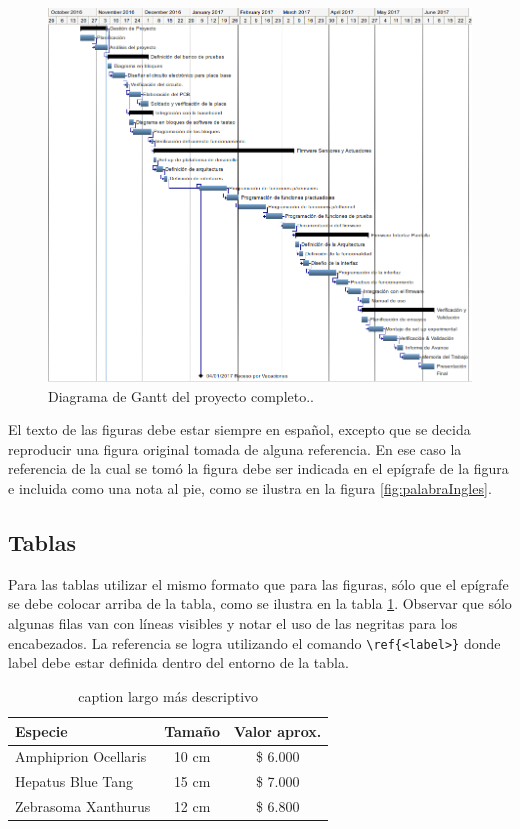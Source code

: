 \begin{figure}[h!]
	\centering
	\includegraphics[scale=.5]{Figures/Gantt_tareas}
	\caption{Diagrama de Gantt del proyecto completo.\protect\footnotemark.}
	\label{fig:Ganttareas}
\end{figure}

El texto de las figuras debe estar siempre en español, excepto que se decida reproducir una figura original tomada de alguna referencia. En ese caso la referencia de la cual se tomó la figura debe ser indicada en el epígrafe de la figura e incluida como una nota al pie, como se ilustra en la figura \ref{fig:palabraIngles}.


\subsection{Tablas}

Para las tablas utilizar el mismo formato que para las figuras, sólo que el epígrafe se debe colocar arriba de la tabla, como se ilustra en la tabla \ref{tab:peces}. Observar que sólo algunas filas van con líneas visibles y notar el uso de las negritas para los encabezados.  La referencia se logra utilizando el comando \verb|\ref{<label>}| donde label debe estar definida dentro del entorno de la tabla.

\begin{table}[h]
	\centering
	\caption[caption corto]{caption largo más descriptivo}
	\begin{tabular}{l c c}    
		\toprule
		\textbf{Especie} 	 & \textbf{Tamaño}  & \textbf{Valor aprox.}  \\
		\midrule
		Amphiprion Ocellaris	 & 10 cm 			& \$ 6.000 \\		
		Hepatus Blue Tang	 & 15 cm				& \$ 7.000 \\
		Zebrasoma Xanthurus	 & 12 cm				& \$ 6.800 \\
		\bottomrule
		\hline
	\end{tabular}
	\label{tab:peces}
\end{table}


